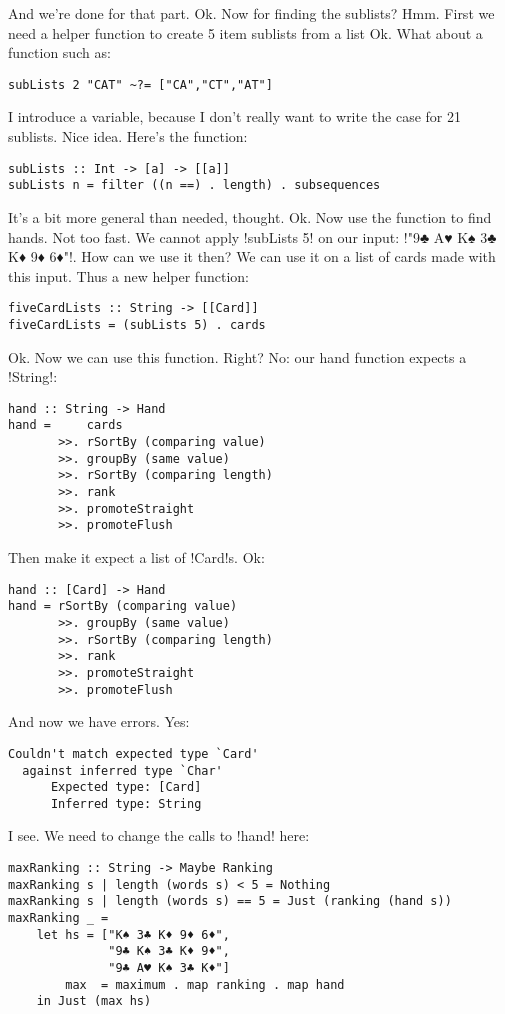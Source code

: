 \success And we're done for that part.
\lhN Ok. Now for finding the sublists?
\lhA Hmm. First we need a helper function to create 5 item sublists from a list
\lhN Ok. What about a function such as:
\begin{lstlisting}[frame=single]
subLists 2 "CAT" ~?= ["CA","CT","AT"]
\end{lstlisting}
I introduce a variable, because I don't really want to write the case for 21 sublists.
\lhA \error Nice idea. Here's the function:
\begin{lstlisting}[frame=single]
subLists :: Int -> [a] -> [[a]]
subLists n = filter ((n ==) . length) . subsequences 
\end{lstlisting}
\success It's a bit more general than needed, thought.
\lhN Ok. Now use the function to find hands.
\lhA Not too fast. We cannot apply \il!subLists 5! on our input: \il!"9♣ A♥ K♠ 3♣ K♦ 9♦ 6♦"!.
\lhN How can we use it then?
\lhA We can use it on a list of cards made with this input. Thus a new helper function:
\begin{lstlisting}[frame=single]
fiveCardLists :: String -> [[Card]]
fiveCardLists = (subLists 5) . cards
\end{lstlisting}
\lhN Ok. Now we can use this function. Right?
\lhA No: our hand function expects a \il!String!:
\begin{lstlisting}[frame=single]
hand :: String -> Hand
hand =     cards
       >>. rSortBy (comparing value)
       >>. groupBy (same value)
       >>. rSortBy (comparing length)
       >>. rank
       >>. promoteStraight
       >>. promoteFlush    
\end{lstlisting}
\lhN Then make it expect a list of \il!Card!s.
\lhA Ok:
\begin{lstlisting}[frame=single]
hand :: [Card] -> Hand
hand = rSortBy (comparing value)
       >>. groupBy (same value)
       >>. rSortBy (comparing length)
       >>. rank
       >>. promoteStraight
       >>. promoteFlush    
\end{lstlisting}
\error And now we have errors.
\lhN Yes:
\begin{small}
\begin{verbatim}
Couldn't match expected type `Card' 
  against inferred type `Char'
      Expected type: [Card]
      Inferred type: String
\end{verbatim}
\end{small}
\lhA \error I see. We need to change the calls to \il!hand! here:
\begin{lstlisting}[frame=single]
maxRanking :: String -> Maybe Ranking
maxRanking s | length (words s) < 5 = Nothing
maxRanking s | length (words s) == 5 = Just (ranking (hand s))
maxRanking _ = 
    let hs = ["K♠ 3♣ K♦ 9♦ 6♦", 
              "9♣ K♠ 3♣ K♦ 9♦", 
              "9♣ A♥ K♠ 3♣ K♦"]
        max  = maximum . map ranking . map hand
    in Just (max hs)
\end{lstlisting}
